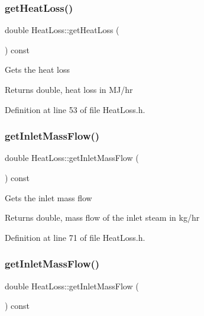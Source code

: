 \subsubsection{\texorpdfstring{get\+Heat\+Loss()}{getHeatLoss()}\hspace{0.1cm}{\footnotesize\ttfamily [3/3]}}
{\footnotesize\ttfamily double Heat\+Loss\+::get\+Heat\+Loss (\begin{DoxyParamCaption}{ }\end{DoxyParamCaption}) const\hspace{0.3cm}{\ttfamily [inline]}}

Gets the heat loss \begin{DoxyReturn}{Returns}
double, heat loss in M\+J/hr 
\end{DoxyReturn}


Definition at line 53 of file Heat\+Loss.\+h.

\mbox{\label{class_heat_loss_ad11a428f99a4945628f66adecb88bf5a}} 
\subsubsection{\texorpdfstring{get\+Inlet\+Mass\+Flow()}{getInletMassFlow()}\hspace{0.1cm}{\footnotesize\ttfamily [1/3]}}
{\footnotesize\ttfamily double Heat\+Loss\+::get\+Inlet\+Mass\+Flow (\begin{DoxyParamCaption}{ }\end{DoxyParamCaption}) const\hspace{0.3cm}{\ttfamily [inline]}}

Gets the inlet mass flow \begin{DoxyReturn}{Returns}
double, mass flow of the inlet steam in kg/hr 
\end{DoxyReturn}


Definition at line 71 of file Heat\+Loss.\+h.

\mbox{\label{class_heat_loss_ad11a428f99a4945628f66adecb88bf5a}} 
\subsubsection{\texorpdfstring{get\+Inlet\+Mass\+Flow()}{getInletMassFlow()}\hspace{0.1cm}{\footnotesize\ttfamily [2/3]}}
{\footnotesize\ttfamily double Heat\+Loss\+::get\+Inlet\+Mass\+Flow (\begin{DoxyParamCaption}{ }\end{DoxyParamCaption}) const\hspace{0.3cm}{\ttfamily [inline]}}


